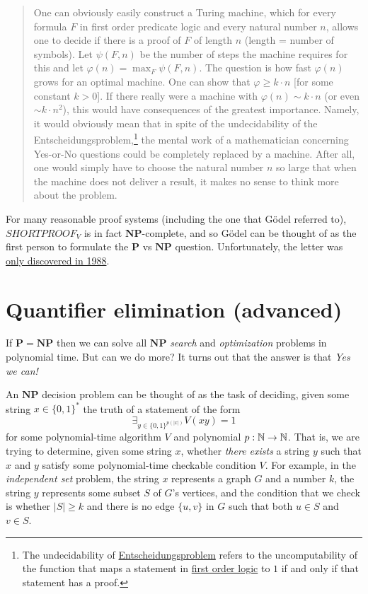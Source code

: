 \begin{quote}
One can obviously easily construct a Turing machine, which for every
formula \(F\) in first order predicate logic and every natural number
\(n\), allows one to decide if there is a proof of \(F\) of length \(n\)
(length = number of symbols). Let \(\psi(F,n)\) be the number of steps
the machine requires for this and let \(\varphi(n) = \max_F \psi(F,n)\).
The question is how fast \(\varphi(n)\) grows for an optimal machine.
One can show that \(\varphi \geq k \cdot n\) {[}for some constant
\(k>0\){]}. If there really were a machine with
\(\varphi(n) \sim k \cdot n\) (or even \(\sim k\cdot n^2\)), this would
have consequences of the greatest importance. Namely, it would obviously
mean that in spite of the undecidability of the
Entscheidungsproblem,\footnote{The undecidability of
  \href{https://en.wikipedia.org/wiki/Entscheidungsproblem}{Entscheidungsproblem}
  refers to the uncomputability of the function that maps a statement in
  \href{https://en.wikipedia.org/wiki/First-order_logic}{first order
  logic} to \(1\) if and only if that statement has a proof.} the mental
work of a mathematician concerning Yes-or-No questions could be
completely replaced by a machine. After all, one would simply have to
choose the natural number \(n\) so large that when the machine does not
deliver a result, it makes no sense to think more about the problem.
\end{quote}

For many reasonable proof systems (including the one that Gödel referred
to), \(\ensuremath{\mathit{SHORTPROOF}}_V\) is in fact
\(\mathbf{NP}\)-complete, and so Gödel can be thought of as the first
person to formulate the \(\mathbf{P}\) vs \(\mathbf{NP}\) question.
Unfortunately, the letter was
\href{https://www.win.tue.nl/~gwoegi/P-versus-NP/sipser.pdf}{only
discovered in 1988}.

\section{Quantifier elimination
(advanced)}\label{Quantifier-elimination-ad}

If \(\mathbf{P}=\mathbf{NP}\) then we can solve all \(\mathbf{NP}\)
\emph{search} and \emph{optimization} problems in polynomial time. But
can we do more? It turns out that the answer is that \emph{Yes we can!}

An \(\mathbf{NP}\) decision problem can be thought of as the task of
deciding, given some string \(x\in \{0,1\}^*\) the truth of a statement
of the form \[
\exists_{y\in \{0,1\}^{p(|x|)}} V(xy)=1
\] for some polynomial-time algorithm \(V\) and polynomial
\(p:{\mathbb{N}} \rightarrow {\mathbb{N}}\). That is, we are trying to determine, given some
string \(x\), whether \emph{there exists} a string \(y\) such that \(x\)
and \(y\) satisfy some polynomial-time checkable condition \(V\). For
example, in the \emph{independent set} problem, the string \(x\)
represents a graph \(G\) and a number \(k\), the string \(y\) represents
some subset \(S\) of \(G\)'s vertices, and the condition that we check
is whether \(|S| \geq k\) and there is no edge \(\{u,v\}\) in \(G\) such
that both \(u\in S\) and \(v\in S\).

